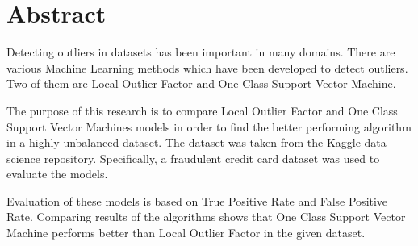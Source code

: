 \chapter*{Abstract}
Detecting outliers in datasets has been important in many domains. There are various Machine Learning methods which have been developed to detect outliers. Two of them are Local Outlier Factor and One Class Support Vector Machine.

The purpose of this research is to compare Local Outlier Factor and One Class Support Vector Machines models in order to find the better performing algorithm in a highly unbalanced dataset. The dataset was taken from the Kaggle data science repository. Specifically, a fraudulent credit card dataset was used to evaluate the models.

Evaluation of these models is based on True Positive Rate and False Positive Rate. Comparing results of the algorithms shows that One Class Support Vector Machine performs better than Local Outlier Factor in the given dataset.


\begin{comment}
@ARTICLE{Larry,
		  AUTHOR = {Larry M. Manevitz and Malik Yousef},
		  TITLE = {One-Class {SVM}s for Document Classification},
		  JOURNAL = {Journal of Machine Learning Research 2 (2001) 139-154},
		  YEAR = {2001}
}
\end{comment}
